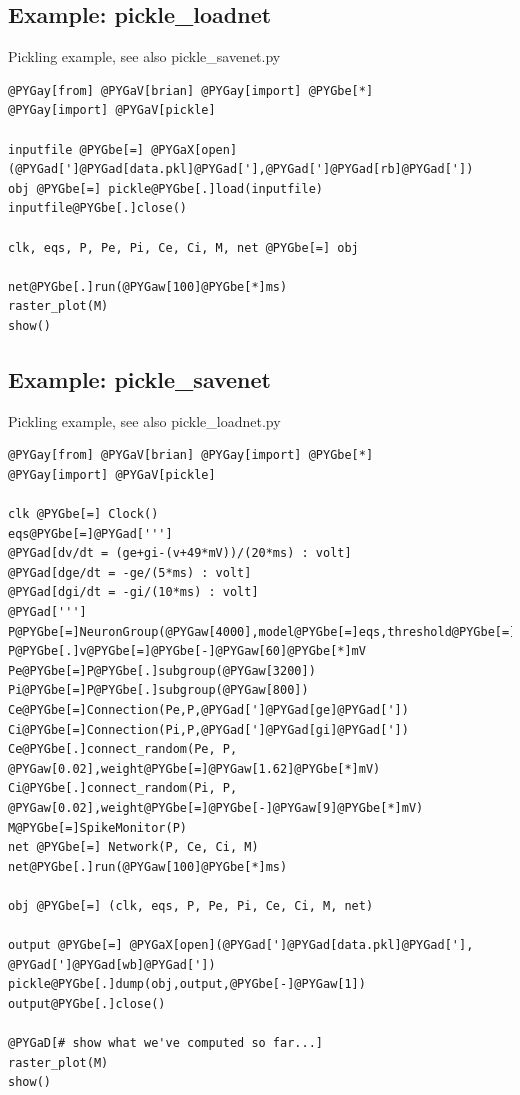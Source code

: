 \documentclass[letterpaper,10pt]{manual}
\begin{document}
\resetcurrentobjects
{}

\hypertarget{index-44}{}\subsection{Example: pickle\_loadnet}

Pickling example, see also pickle\_savenet.py

\begin{Verbatim}[commandchars=@\[\]]
@PYGay[from] @PYGaV[brian] @PYGay[import] @PYGbe[*]
@PYGay[import] @PYGaV[pickle]

inputfile @PYGbe[=] @PYGaX[open](@PYGad[']@PYGad[data.pkl]@PYGad['],@PYGad[']@PYGad[rb]@PYGad['])
obj @PYGbe[=] pickle@PYGbe[.]load(inputfile)
inputfile@PYGbe[.]close()

clk, eqs, P, Pe, Pi, Ce, Ci, M, net @PYGbe[=] obj

net@PYGbe[.]run(@PYGaw[100]@PYGbe[*]ms)
raster_plot(M)
show()
\end{Verbatim}

\resetcurrentobjects
{}

\hypertarget{index-45}{}\subsection{Example: pickle\_savenet}

Pickling example, see also pickle\_loadnet.py

\begin{Verbatim}[commandchars=@\[\]]
@PYGay[from] @PYGaV[brian] @PYGay[import] @PYGbe[*]
@PYGay[import] @PYGaV[pickle]

clk @PYGbe[=] Clock()
eqs@PYGbe[=]@PYGad[''']
@PYGad[dv/dt = (ge+gi-(v+49*mV))/(20*ms) : volt]
@PYGad[dge/dt = -ge/(5*ms) : volt]
@PYGad[dgi/dt = -gi/(10*ms) : volt]
@PYGad[''']
P@PYGbe[=]NeuronGroup(@PYGaw[4000],model@PYGbe[=]eqs,threshold@PYGbe[=]@PYGbe[-]@PYGaw[50]@PYGbe[*]mV,reset@PYGbe[=]@PYGbe[-]@PYGaw[60]@PYGbe[*]mV)
P@PYGbe[.]v@PYGbe[=]@PYGbe[-]@PYGaw[60]@PYGbe[*]mV
Pe@PYGbe[=]P@PYGbe[.]subgroup(@PYGaw[3200])
Pi@PYGbe[=]P@PYGbe[.]subgroup(@PYGaw[800])
Ce@PYGbe[=]Connection(Pe,P,@PYGad[']@PYGad[ge]@PYGad['])
Ci@PYGbe[=]Connection(Pi,P,@PYGad[']@PYGad[gi]@PYGad['])
Ce@PYGbe[.]connect_random(Pe, P, @PYGaw[0.02],weight@PYGbe[=]@PYGaw[1.62]@PYGbe[*]mV)
Ci@PYGbe[.]connect_random(Pi, P, @PYGaw[0.02],weight@PYGbe[=]@PYGbe[-]@PYGaw[9]@PYGbe[*]mV)
M@PYGbe[=]SpikeMonitor(P)
net @PYGbe[=] Network(P, Ce, Ci, M)
net@PYGbe[.]run(@PYGaw[100]@PYGbe[*]ms)

obj @PYGbe[=] (clk, eqs, P, Pe, Pi, Ce, Ci, M, net)

output @PYGbe[=] @PYGaX[open](@PYGad[']@PYGad[data.pkl]@PYGad['], @PYGad[']@PYGad[wb]@PYGad['])
pickle@PYGbe[.]dump(obj,output,@PYGbe[-]@PYGaw[1])
output@PYGbe[.]close()

@PYGaD[# show what we've computed so far...]
raster_plot(M)
show()
\end{Verbatim}
\end{document}
